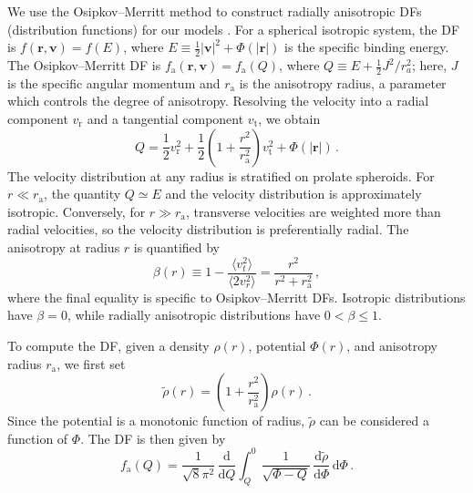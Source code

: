 \documentclass[fleqn,usenatbib]{mnras}
\begin{document}
We use the Osipkov--Merritt method to construct radially anisotropic DFs (distribution functions) for our models \citep{Osipkov1979,Merritt1985}. For a spherical isotropic system, the DF is $f(\mathbf{r}, \mathbf{v}) = f(E)$, where $E \equiv \frac{1}{2} |\mathbf{v}|^2 + \Phi(|\mathbf{r}|)$ is the specific binding energy. The Osipkov--Merritt DF is $f_\mathrm{a}(\mathbf{r}, \mathbf{v}) = f_\mathrm{a}(Q)$, where $Q \equiv E + \frac{1}{2} J^2 / r_a^2$; here, $J$ is the specific angular momentum and $r_\mathrm{a}$ is the anisotropy radius, a parameter which controls the degree of anisotropy. Resolving the velocity into a radial component $v_\mathrm{r}$ and a tangential component $v_\mathrm{t}$, we obtain
\begin{equation}
    Q = \frac{1}{2} v_\mathrm{r}^2 +
        \frac{1}{2} \left(1 + \frac{r^2}{r_\mathrm{a}^2} \right) v_\mathrm{t}^2 + \Phi(|\mathbf{r}|) \, .
\end{equation}
The velocity distribution at any radius is stratified on prolate spheroids. For $r \ll r_\mathrm{a}$, the quantity $Q \simeq E$ and the velocity distribution is approximately isotropic. Conversely, for $r \gg r_\mathrm{a}$, transverse velocities are weighted more than radial velocities, so the velocity distribution is preferentially radial. The anisotropy at radius $r$ is quantified by
\begin{equation}
    \beta(r) \equiv 1 - \frac{\langle v_t^2 \rangle}{\langle 2 v_r^2 \rangle}
             = \frac{r^2}{r^2 + r_\mathrm{a}^2} \, ,
\end{equation}
where the final equality is specific to Osipkov--Merritt DFs. Isotropic distributions have $\beta = 0$, while radially anisotropic distributions have $0 < \beta \le 1$.

To compute the DF, given a density $\rho(r)$, potential $\Phi(r)$, and anisotropy radius $r_\mathrm{a}$, we first set
\begin{equation}
    \tilde{\rho}(r) = \left( 1 + \frac{r^2}{r_\mathrm{a}^2} \right) \rho(r) \, .
\end{equation}
Since the potential is a monotonic function of radius, $\tilde{\rho}$ can be considered a function of $\Phi$. The DF is then given by
\begin{equation}
    f_\mathrm{a}(Q) = \frac{1}{\sqrt{8} \pi^2} \, \frac{\mathrm{d}}{\mathrm{d}Q}
        \int_Q^0 \frac{1}{\sqrt{\Phi - Q}} \,
            \frac{\mathrm{d}\tilde{\rho}}{\mathrm{d}\Phi} \, \mathrm{d}\Phi \, .
            \label{eq:OM_formula}
\end{equation}
\end{document}
